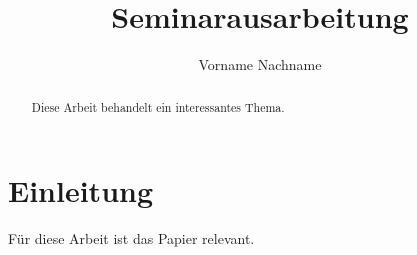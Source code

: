\documentclass{llncs}
\title{Seminarausarbeitung}
\author{Vorname Nachname}
\institute{%
   Fakultät für Informatik, \\
   Technische Universität München \\
   \email{email@in.tum.de}
}
\begin{document}
\maketitle

\begin{abstract}
Diese Arbeit behandelt ein interessantes Thema.
\end{abstract}

\section{Einleitung}

Für diese Arbeit ist das Papier \cite{Popek1974} relevant.



\end{document}

